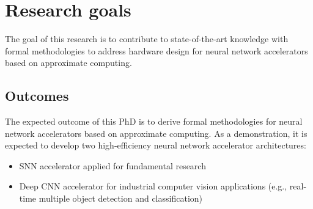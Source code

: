 \section{Research goals}
The goal of this research is to contribute to state-of-the-art knowledge with formal methodologies to address hardware design for neural network accelerators based on approximate computing.

\subsection{Outcomes}
The expected outcome of this PhD is to derive formal methodologies for neural network accelerators based on approximate computing. As a demonstration, it is expected to develop two high-efficiency neural network accelerator architectures:

\begin{itemize}
\item SNN accelerator applied for fundamental research
\item Deep CNN accelerator for industrial computer vision applications (e.g., real-time multiple object detection and classification)
\end{itemize}